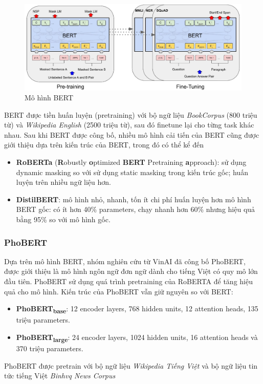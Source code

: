 \documentclass[12pt]{article}
\begin{document}
\begin{figure}
\centering
\includegraphics[scale=.65]{img/BERT.jpg}
\caption{Mô hình BERT\cite{devlin-etal-2019-bert}}
\label{fig:my_label}
\end{figure}
BERT được tiền huấn luyện (pretraining) với bộ ngữ liệu \textit{BookCorpus} (800 triệu từ) và \textit{Wikipedia English} (2500 triệu từ), sau đó finetune lại cho từng task khác nhau. Sau khi BERT được công bố, nhiều mô hình cải tiến của BERT cũng được giới thiệu dựa trên kiến trúc của BERT, trong đó có thể kể đến
\begin{itemize}
\item \textbf{RoBERTa} (\textbf{R}obustly \textbf{o}ptimized \textbf{BERT} Pretraining \textbf{a}pproach)\cite{DBLP:journals/corr/abs-1907-11692}: sử dụng dynamic masking so với sử dụng static masking trong kiến trúc gốc; huấn luyện trên nhiều ngữ liệu hơn.
\item \textbf{DistilBERT}\cite{DBLP:journals/corr/abs-1910-01108}: mô hình nhỏ, nhanh, tốn ít chi phí huấn luyện hơn mô hình BERT gốc: có ít hơn 40\% parameters, chạy nhanh hơn 60\% nhưng hiệu quả bằng 95\% so với mô hình gốc.
\end{itemize}

\subsubsection{PhoBERT}
Dựa trên mô hình BERT, nhóm nghiên cứu từ VinAI đã công bố PhoBERT\cite{phobert}, được giới thiệu là mô hình ngôn ngữ đơn ngữ dành cho tiếng Việt có quy mô lớn đầu tiên. PhoBERT sử dụng quá trình pretraining của RoBERTA để tăng hiệu quả cho mô hình. Kiến trúc của PhoBERT vẫn giữ nguyên so với BERT:
\begin{itemize}
\item \textbf{PhoBERT\textsubscript{base}}: 12 encoder layers, 768 hidden units, 12 attention heads, 135 triệu parameters.
\item \textbf{PhoBERT\textsubscript{large}}: 24 encoder layers, 1024 hidden units, 16 attention heads và 370 triệu parameters.
\end{itemize}
PhoBERT được pretrain với bộ ngữ liệu \textit{Wikipedia Tiếng Việt} và bộ ngữ liệu tin tức tiếng Việt \textit{Binhvq News Corpus}
\end{document}
